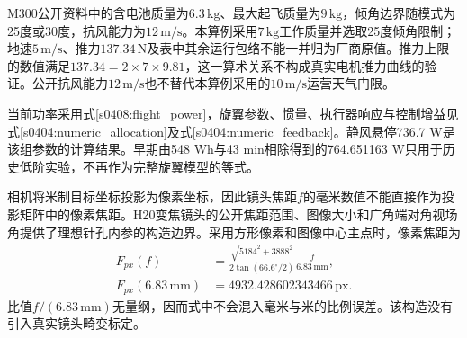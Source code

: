 M300公开资料中的含电池质量为$6.3\,\mathrm{kg}$、最大起飞质量为$9\,\mathrm{kg}$，倾角边界随模式为25度或30度，抗风能力为$12\,\mathrm{m/s}$\cite{DJIM300}。本算例采用$7\,\mathrm{kg}$工作质量并选取25度倾角限制；地速$5\,\mathrm{m/s}$、推力$137.34\,\mathrm N$及表中其余运行包络不能一并归为厂商原值。推力上限的数值满足$137.34=2\times7\times9.81$，这一算术关系不构成真实电机推力曲线的验证。公开抗风能力$12\,\mathrm{m/s}$也不替代本算例采用的$10\,\mathrm{m/s}$运营天气门限。

当前功率采用式\eqref{s0408:flight_power}，旋翼参数、惯量、执行器响应与控制增益见式\eqref{s0404:numeric_allocation}及式\eqref{s0404:numeric_feedback}。静风悬停736.7 W是该组参数的计算结果。早期由548 Wh与43 min相除得到的764.651163 W只用于历史低阶实验，不再作为完整旋翼模型的等式。

相机将米制目标坐标投影为像素坐标，因此镜头焦距$f$的毫米数值不能直接作为投影矩阵中的像素焦距。H20变焦镜头的公开焦距范围、图像大小和广角端对角视场角提供了理想针孔内参的构造边界\cite{DJIH20}。采用方形像素和图像中心主点时，像素焦距为
\begin{align}
 F_{px}(f)
 &=\frac{\sqrt{5184^2+3888^2}}{2\tan(66.6^\circ/2)}
   \frac{f}{6.83\,\mathrm{mm}},\\
 F_{px}(6.83\,\mathrm{mm})&=4932.428602343466\,\mathrm{px}.
 \label{s0601:focal_conversion}
\end{align}
比值$f/(6.83\,\mathrm{mm})$无量纲，因而式中不会混入毫米与米的比例误差。该构造没有引入真实镜头畸变标定。

